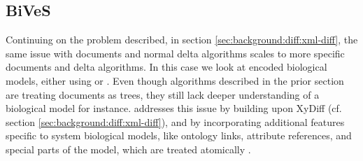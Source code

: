 	
	\subsection{BiVeS}
	\label{sec:background:diff:bives}
	Continuing on the problem described, in section \ref{sec:background:diff:xml-diff}, the same issue with \xml documents and normal delta algorithms scales to more specific documents and \xml delta algorithms. In this case we look at \xml encoded biological models, either using \cellml or \sbml. Even though algorithms described in the prior section are treating \xml documents as trees, they still lack deeper understanding of a biological model for instance. \bives addresses this issue by building upon XyDiff (cf. section \ref{sec:background:diff:xml-diff}), and by incorporating additional features specific to system biological models, like ontology links, attribute references, and special parts of the model, which are treated atomically \citep{Scharm2015}.
	
